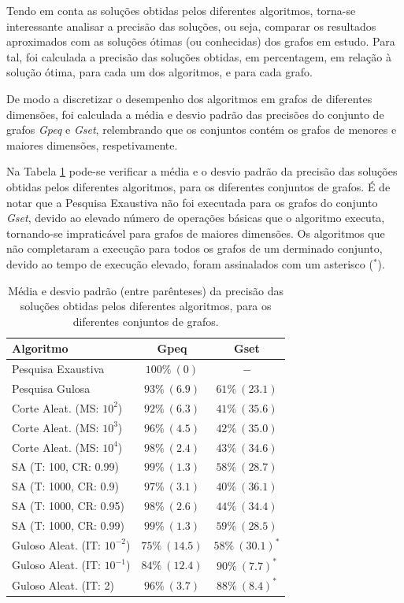 \documentclass[mirror, portugues]{revdetua}
\begin{document}
Tendo em conta as soluções obtidas pelos diferentes algoritmos, torna-se interessante analisar a precisão das soluções, ou seja, comparar os resultados aproximados com as soluções ótimas (ou conhecidas) dos grafos em estudo. Para tal, foi calculada a precisão das soluções obtidas, em percentagem, em relação à solução ótima, para cada um dos algoritmos, e para cada grafo.

De modo a discretizar o desempenho dos algoritmos em grafos de diferentes dimensões, foi calculada a média e desvio padrão das precisões do conjunto de grafos \textit{Gpeq} e \textit{Gset}, relembrando que os conjuntos contém os grafos de menores e maiores dimensões, respetivamente.

Na Tabela \ref{table:precision} pode-se verificar a média e o desvio padrão da precisão das soluções obtidas pelos diferentes algoritmos, para os diferentes conjuntos de grafos. É de notar que a Pesquisa Exaustiva não foi executada para os grafos do conjunto \textit{Gset}, devido ao elevado número de operações básicas que o algoritmo executa, tornando-se impraticável para grafos de maiores dimensões. Os algoritmos que não completaram a execução para todos os grafos de um derminado conjunto, devido ao tempo de execução elevado, foram assinalados com um asterisco ($^*$).


\begin{table}[H]
\centering
\caption{Média e desvio padrão (entre parênteses) da precisão das soluções obtidas pelos diferentes algoritmos, para os diferentes conjuntos de grafos.}
\label{table:precision}
\begin{tabular}{lcc}
\toprule
\textbf{Algoritmo} & \textbf{Gpeq} & \textbf{Gset} \\
\midrule
Pesquisa Exaustiva & $100\% \ (0)$ & $-$ \\
Pesquisa Gulosa & $93\% \ (6.9)$ & $61\% \ (23.1)$ \\
Corte Aleat. (MS: $10^2$) & $92\% \ (6.3)$ & $41\% \ (35.6)$ \\
Corte Aleat. (MS: $10^3$) & $96\% \ (4.5)$ & $42\% \ (35.0)$ \\
Corte Aleat. (MS: $10^4$) & $98\% \ (2.4)$ & $43\% \ (34.6)$ \\
SA (T: 100, CR: 0.99) & $99\% \ (1.3)$ & $58\% \ (28.7)$ \\
SA (T: 1000, CR: 0.9) & $97\% \ (3.1)$ & $40\% \ (36.1)$ \\
SA (T: 1000, CR: 0.95) & $98\% \ (2.6)$ & $44\% \ (34.4)$ \\
SA (T: 1000, CR: 0.99) & $99\% \ (1.3)$ & $59\% \ (28.5)$ \\
Guloso Aleat. (IT: $10^{-2}$) & $75\% \ (14.5)$ & $58\% \ (30.1)^*$\\
Guloso Aleat. (IT: $10^{-1}$) & $84\% \ (12.4)$ & $90\% \ (7.7)^*$\\
Guloso Aleat. (IT: 2) & $96\% \ (3.7)$ & $88\% \ (8.4)^*$ \\
\bottomrule
\end{tabular}
\end{table}
\end{document}
